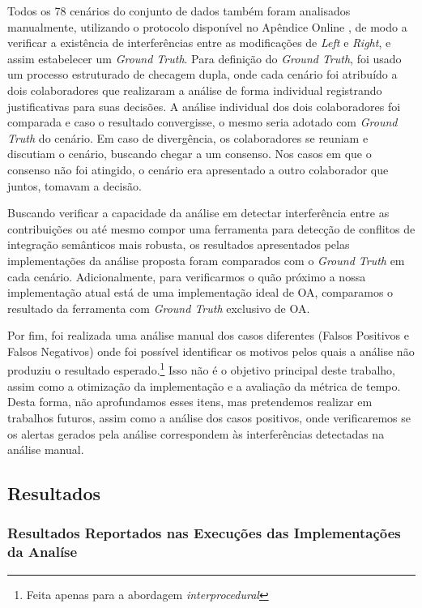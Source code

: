 Todos os 78 cenários do conjunto de dados também foram analisados manualmente, utilizando o protocolo disponível no Apêndice Online , de modo a verificar a existência de interferências entre as modificações de \emph{Left} e \emph{Right}, e assim estabelecer um \emph{Ground Truth}. Para definição do \emph{Ground Truth}, foi usado um processo estruturado de checagem dupla, onde cada cenário foi atribuído a dois colaboradores que realizaram a análise de forma individual registrando justificativas para suas decisões. A análise individual dos dois colaboradores foi comparada e caso o resultado convergisse, o mesmo seria adotado com \emph{Ground Truth} do cenário. Em caso de divergência, os colaboradores se reuniam e discutiam o cenário, buscando chegar a um consenso. Nos casos em que o consenso não foi atingido, o cenário era apresentado a outro colaborador que juntos, tomavam a decisão.

Buscando verificar a capacidade da análise em detectar interferência entre as contribuições ou até mesmo compor uma ferramenta para detecção de conflitos de integração semânticos mais robusta, os resultados apresentados pelas implementações da análise proposta foram comparados com o \emph{Ground Truth} em cada cenário. Adicionalmente, para verificarmos o quão próximo a nossa implementação atual está de uma implementação ideal de OA, comparamos o resultado da ferramenta com \emph{Ground Truth} exclusivo de OA. 

Por fim, foi realizada uma análise manual dos casos diferentes (Falsos Positivos e Falsos Negativos) onde foi possível identificar os motivos pelos quais a análise não produziu o resultado esperado.\footnote{Feita apenas para a abordagem \emph{interprocedural}} Isso não é o objetivo principal deste trabalho, assim como a otimização da implementação e a avaliação da métrica de tempo. Desta forma, não aprofundamos esses itens, mas pretendemos realizar em trabalhos futuros, assim como a análise dos casos positivos, onde verificaremos se os alertas gerados pela análise correspondem às interferências detectadas na análise manual.

\subsection{Resultados}

\subsubsection{Resultados Reportados nas Execuções das Implementações da Analíse}

